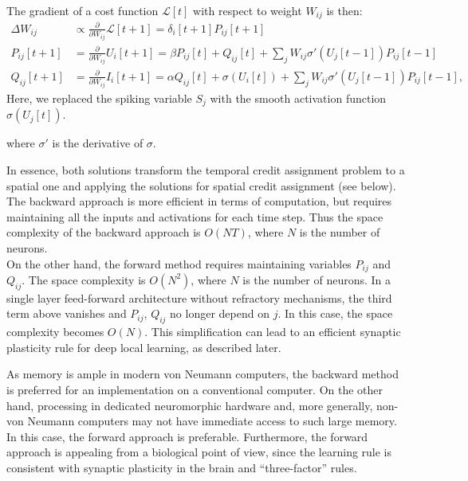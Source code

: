 \documentclass[journal,onecolumn,11pt]{IEEEtran}
\begin{document}
\begin{enumerate}
The gradient of a cost function $\mathcal{L}[t]$ with respect to weight $W_{ij}$ is then:
\[
\begin{split} \label{eq:forward_mode_differentiation}
 \Delta {W_{ij}} &\propto \frac{\partial }{\partial W_{ij}} \mathcal{L}[t+1] = \delta_i[t+1] P_{ij}[t+1]\\
 P_{ij}[t+1]     &= \frac{\partial} {\partial W_{ij}}  U_i[t+1] = \beta P_{ij}[t] + Q_{ij}[t] + \sum_j W_{ij} \sigma'(U_j[t-1]) P_{ij}[t-1]\\
 Q_{ij}[t+1]     &= \frac{\partial} {\partial W_{ij}}  I_i[t+1] = \alpha Q_{ij}[t] + \sigma(U_i[t]) + \sum_j W_{ij} \sigma'(U_j[t-1]) P_{ij}[t-1],
\end{split}
\]
Here, we replaced the spiking variable $S_j$ with the smooth activation function $\sigma(U_j[t])$.

where $\sigma'$ is the derivative of $\sigma$.
\end{enumerate}


In essence, both solutions transform the temporal credit assignment problem to a spatial one and applying the solutions for spatial credit assignment (see below).
The backward approach is more efficient in terms of computation, but requires maintaining all the inputs and activations for each time step.
Thus the space complexity of the backward approach is $O(N T)$, where $N$ is the number of neurons.\\
On the other hand, the forward method requires maintaining variables $P_{ij}$ and $Q_{ij}$.
The space complexity is $O(N^2)$, where $N$ is the number of neurons.
In a single layer feed-forward architecture without refractory mechanisms, the third term above vanishes and $P_{ij}$, $Q_{ij}$ no longer depend on $j$.
In this case, the space complexity becomes $O(N)$.
This simplification can lead to an efficient synaptic plasticity rule for deep local learning, as described later.

As memory is ample in modern von Neumann computers, the backward method is preferred for an implementation on a conventional computer.
On the other hand, processing in dedicated neuromorphic hardware and, more generally, non-von Neumann computers may not have immediate access to such large memory.
In this case, the forward approach is preferable.
Furthermore, the forward approach is appealing from a biological point of view, since the learning rule is consistent with synaptic plasticity in the brain and ``three-factor'' rules.
\end{document}

